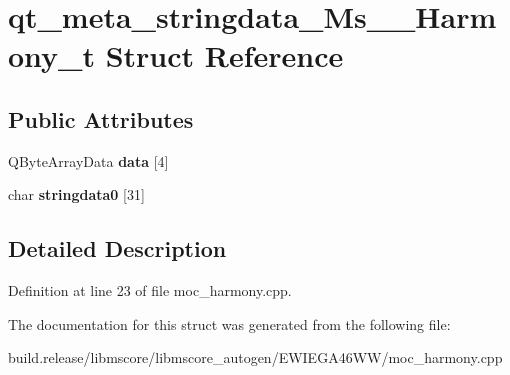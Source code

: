 \hypertarget{structqt__meta__stringdata___ms_____harmony__t}{}\section{qt\+\_\+meta\+\_\+stringdata\+\_\+\+Ms\+\_\+\+\_\+\+Harmony\+\_\+t Struct Reference}
\label{structqt__meta__stringdata___ms_____harmony__t}
\subsection*{Public Attributes}
\begin{DoxyCompactItemize}
\item 
\mbox{\label{structqt__meta__stringdata___ms_____harmony__t_a9e18baaa43d14e95c096de1d1bb12e43}} 
Q\+Byte\+Array\+Data {\bfseries data} \mbox{[}4\mbox{]}
\item 
\mbox{\label{structqt__meta__stringdata___ms_____harmony__t_a7019816c35c67d43be66cf35022fcd3f}} 
char {\bfseries stringdata0} \mbox{[}31\mbox{]}
\end{DoxyCompactItemize}


\subsection{Detailed Description}


Definition at line 23 of file moc\+\_\+harmony.\+cpp.



The documentation for this struct was generated from the following file\+:\begin{DoxyCompactItemize}
\item 
build.\+release/libmscore/libmscore\+\_\+autogen/\+E\+W\+I\+E\+G\+A46\+W\+W/moc\+\_\+harmony.\+cpp\end{DoxyCompactItemize}
